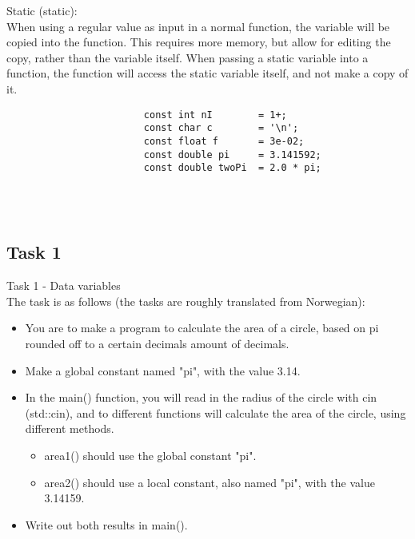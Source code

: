 \documentclass{report}
\begin{document}
				\begin{minipage}{\linewidth}
					Static (static): \\
					When using a regular value as input in a normal function, the variable will be copied into the function.
					This requires more memory, but allow for editing the copy, rather than the variable itself.
					When passing a static variable into a function, the function will access the static variable itself, and not make a copy of it.
					\begin{lstlisting}
						const int nI 		= 1+;
						const char c 		= '\n';
						const float f		= 3e-02;
						const double pi		= 3.141592;
						const double twoPi	= 2.0 * pi;
					\end{lstlisting} 
				\end{minipage}
				\\ \\
			
			
			\subsection{Task 1}
				Task 1 - Data variables \\
				The task is as follows (the tasks are roughly translated from Norwegian):
				
				\begin{itemize}
					\item You are to make a program to calculate the area of a circle,
						based on pi rounded off to a certain decimals amount of decimals.
					\item Make a global constant named "pi", with the value 3.14.
					\item In the main() function, you will read in the radius of the circle with cin (std::cin),
						and to different functions will calculate the area of the circle, using different methods.
					\begin{itemize}
						\item area1() should use the global constant "pi".
						\item area2() should use a local constant, also named "pi", with the value 3.14159.
					\end{itemize}
					\item Write out both results in main().
				\end{itemize}
				
\end{document}
